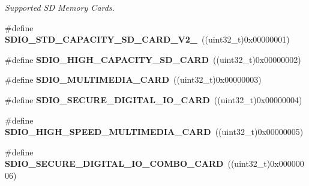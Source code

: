 \begin{DoxyCompactItemize}
\begin{DoxyCompactList}\small\item\em Supported SD Memory Cards. \end{DoxyCompactList}\item 
\#define {\bfseries S\+D\+I\+O\+\_\+\+S\+T\+D\+\_\+\+C\+A\+P\+A\+C\+I\+T\+Y\+\_\+\+S\+D\+\_\+\+C\+A\+R\+D\+\_\+\+V2\+\_}~((uint32\+\_\+t)0x00000001)\hypertarget{group___s_t_m324x_g___e_v_a_l___s_d_i_o___s_d___exported___constants_ga9e67ed9afb202bc0d2993e17ce940b0d}{}\label{group___s_t_m324x_g___e_v_a_l___s_d_i_o___s_d___exported___constants_ga9e67ed9afb202bc0d2993e17ce940b0d}

\item 
\#define {\bfseries S\+D\+I\+O\+\_\+\+H\+I\+G\+H\+\_\+\+C\+A\+P\+A\+C\+I\+T\+Y\+\_\+\+S\+D\+\_\+\+C\+A\+RD}~((uint32\+\_\+t)0x00000002)\hypertarget{group___s_t_m324x_g___e_v_a_l___s_d_i_o___s_d___exported___constants_gac99ee44931ecbf64e04623c442c00916}{}\label{group___s_t_m324x_g___e_v_a_l___s_d_i_o___s_d___exported___constants_gac99ee44931ecbf64e04623c442c00916}

\item 
\#define {\bfseries S\+D\+I\+O\+\_\+\+M\+U\+L\+T\+I\+M\+E\+D\+I\+A\+\_\+\+C\+A\+RD}~((uint32\+\_\+t)0x00000003)\hypertarget{group___s_t_m324x_g___e_v_a_l___s_d_i_o___s_d___exported___constants_ga857bc50f4f97f7f5f525da94db9b2774}{}\label{group___s_t_m324x_g___e_v_a_l___s_d_i_o___s_d___exported___constants_ga857bc50f4f97f7f5f525da94db9b2774}

\item 
\#define {\bfseries S\+D\+I\+O\+\_\+\+S\+E\+C\+U\+R\+E\+\_\+\+D\+I\+G\+I\+T\+A\+L\+\_\+\+I\+O\+\_\+\+C\+A\+RD}~((uint32\+\_\+t)0x00000004)\hypertarget{group___s_t_m324x_g___e_v_a_l___s_d_i_o___s_d___exported___constants_ga2a0f3bb0a673de7c62c071865307a36e}{}\label{group___s_t_m324x_g___e_v_a_l___s_d_i_o___s_d___exported___constants_ga2a0f3bb0a673de7c62c071865307a36e}

\item 
\#define {\bfseries S\+D\+I\+O\+\_\+\+H\+I\+G\+H\+\_\+\+S\+P\+E\+E\+D\+\_\+\+M\+U\+L\+T\+I\+M\+E\+D\+I\+A\+\_\+\+C\+A\+RD}~((uint32\+\_\+t)0x00000005)\hypertarget{group___s_t_m324x_g___e_v_a_l___s_d_i_o___s_d___exported___constants_ga202a3247319d79b72bd2968761b75144}{}\label{group___s_t_m324x_g___e_v_a_l___s_d_i_o___s_d___exported___constants_ga202a3247319d79b72bd2968761b75144}

\item 
\#define {\bfseries S\+D\+I\+O\+\_\+\+S\+E\+C\+U\+R\+E\+\_\+\+D\+I\+G\+I\+T\+A\+L\+\_\+\+I\+O\+\_\+\+C\+O\+M\+B\+O\+\_\+\+C\+A\+RD}~((uint32\+\_\+t)0x00000006)\hypertarget{group___s_t_m324x_g___e_v_a_l___s_d_i_o___s_d___exported___constants_ga63b1da6dd1a51131f3b53f1fbfb41ae3}{}\label{group___s_t_m324x_g___e_v_a_l___s_d_i_o___s_d___exported___constants_ga63b1da6dd1a51131f3b53f1fbfb41ae3}


\end{DoxyCompactItemize}
